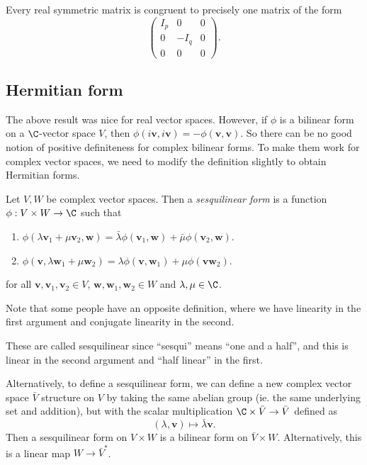 \documentclass[a4paper]{article}
\begin{document}
\begin{cor}
  Every real symmetric matrix is congruent to precisely one matrix of the form
  \[
    \begin{pmatrix}
      I_p & 0 & 0\\
      0 & -I_q & 0\\
      0 & 0 & 0
    \end{pmatrix}.
  \]
\end{cor}
\subsection{Hermitian form}
The above result was nice for real vector spaces. However, if $\phi$ is a bilinear form on a $\C$-vector space $V$, then $\phi(i\mathbf{v}, i\mathbf{v}) = -\phi(\mathbf{v}, \mathbf{v})$. So there can be no good notion of positive definiteness for complex bilinear forms. To make them work for complex vector spaces, we need to modify the definition slightly to obtain Hermitian forms.

\begin{defi}
  Let $V, W$ be complex vector spaces. Then a \emph{sesquilinear form} is a function $\phi: V \times W \to \C$ such that
  \begin{enumerate}
    \item $\phi(\lambda \mathbf{v}_1 + \mu \mathbf{v}_2, \mathbf{w}) = \bar{\lambda} \phi(\mathbf{v}_1, \mathbf{w}) + \bar{\mu}\phi(\mathbf{v}_2, \mathbf{w})$.
    \item $\phi(\mathbf{v}, \lambda \mathbf{w}_1 + \mu \mathbf{w}_2) = \lambda \phi(\mathbf{v}, \mathbf{w}_1) + \mu \phi(\mathbf{v} \mathbf{w}_2)$.
  \end{enumerate}
  for all $\mathbf{v}, \mathbf{v}_1, \mathbf{v}_2 \in V$, $\mathbf{w}, \mathbf{w}_1, \mathbf{w}_2 \in W$ and $\lambda, \mu \in \C$.
\end{defi}
Note that some people have an opposite definition, where we have linearity in the first argument and conjugate linearity in the second.

These are called sesquilinear since ``sesqui'' means ``one and a half'', and this is linear in the second argument and ``half linear'' in the first.

Alternatively, to define a sesquilinear form, we can define a new complex vector space $\bar{V}$ structure on $V$ by taking the same abelian group (ie. the same underlying set and addition), but with the scalar multiplication $\C \times \bar{V} \to \bar{V}$ defined as
\[
  (\lambda, \mathbf{v}) \mapsto \bar{\lambda} \mathbf{v}.
\]
Then a sesquilinear form on $V\times W$ is a bilinear form on $\bar{V} \times W$. Alternatively, this is a linear map $W \to \bar{V}^*$.
\end{document}
